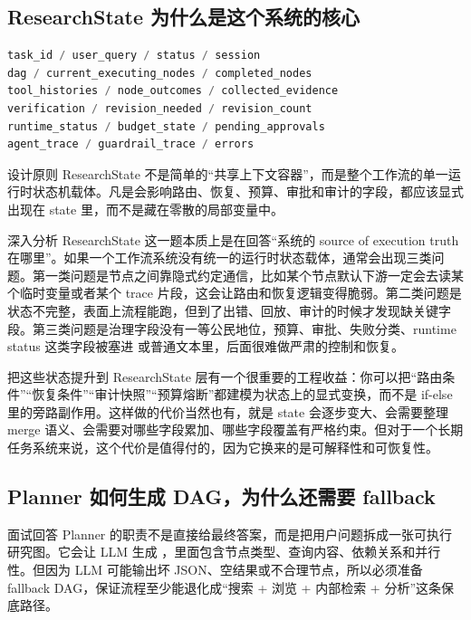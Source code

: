 \documentclass[12pt]{article}
\begin{document}
\subsection{ResearchState 为什么是这个系统的核心}
\begin{lstlisting}[language=Python,caption={ResearchState 中最关键的状态维度}]
task_id / user_query / status / session
dag / current_executing_nodes / completed_nodes
tool_histories / node_outcomes / collected_evidence
verification / revision_needed / revision_count
runtime_status / budget_state / pending_approvals
agent_trace / guardrail_trace / errors
\end{lstlisting}

\begin{summaryBox}{设计原则}
ResearchState 不是简单的“共享上下文容器”，而是整个工作流的单一运行时状态机载体。凡是会影响路由、恢复、预算、审批和审计的字段，都应该显式出现在 state 里，而不是藏在零散的局部变量中。
\end{summaryBox}

\begin{analysisBox}{深入分析}
ResearchState 这一题本质上是在回答“系统的 source of execution truth 在哪里”。如果一个工作流系统没有统一的运行时状态载体，通常会出现三类问题。第一类问题是节点之间靠隐式约定通信，比如某个节点默认下游一定会去读某个临时变量或者某个 trace 片段，这会让路由和恢复逻辑变得脆弱。第二类问题是状态不完整，表面上流程能跑，但到了出错、回放、审计的时候才发现缺关键字段。第三类问题是治理字段没有一等公民地位，预算、审批、失败分类、runtime status 这类字段被塞进  或普通文本里，后面很难做严肃的控制和恢复。

把这些状态提升到 ResearchState 层有一个很重要的工程收益：你可以把“路由条件”“恢复条件”“审计快照”“预算熔断”都建模为状态上的显式变换，而不是 if-else 里的旁路副作用。这样做的代价当然也有，就是 state 会逐步变大、会需要整理 merge 语义、会需要对哪些字段累加、哪些字段覆盖有严格约束。但对于一个长期任务系统来说，这个代价是值得付的，因为它换来的是可解释性和可恢复性。
\end{analysisBox}

\subsection{Planner 如何生成 DAG，为什么还需要 fallback}
\begin{qaBox}{面试回答}
Planner 的职责不是直接给最终答案，而是把用户问题拆成一张可执行研究图。它会让 LLM 生成 ，里面包含节点类型、查询内容、依赖关系和并行性。但因为 LLM 可能输出坏 JSON、空结果或不合理节点，所以必须准备 fallback DAG，保证流程至少能退化成“搜索 + 浏览 + 内部检索 + 分析”这条保底路径。
\end{qaBox}
\end{document}
